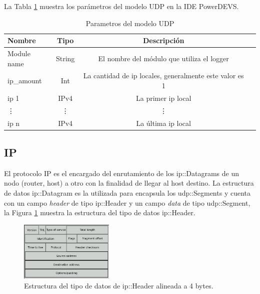 \documentclass[10pt,a4paper]{article}
\begin{document}
La Tabla \ref{table: parameters UDP} muestra los parámetros del modelo UDP en la IDE PowerDEVS.
\begin{table}[h]
\begin{tabular}{|l|c|c|c|}
  \hline
  Nombre & Tipo & Descripción \\
  \hline
  Module name & String & El nombre del módulo que utiliza el logger \\
  \hline
  ip\_amount & Int & La cantidad de ip locales, generalmente este valor es 1 \\
  \hline
  ip 1 & IPv4 & La primer ip local \\
  \hline
  \vdots & \vdots & \vdots \\
  \hline
  ip n & IPv4 & La última ip local \\
  \hline
\end{tabular}
\caption{Parametros del modelo UDP}
\label{table: parameters UDP}
\end{table}

\subsection{IP}

El protocolo IP es el encargado del enrutamiento de los ip::Datagrams de un nodo (router, host) a otro con la finalidad de llegar al host destino. La estructura de datos ip::Datagram es la utilizada para encapsula los udp::Segments y cuenta con un campo \textit{header} de tipo ip::Header y un campo \textit{data} de tipo udp::Segment, la Figura \ref{figure: ip header} muestra la estructura del tipo de datos ip::Header.  \\

\begin{figure}[!htb]
    \centering
    \includegraphics[width = 0.4\textwidth]{img/png/IP-datagram.png}
    \caption{Estructura del tipo de datos de ip::Header alineada a 4 bytes.}
    \label{figure: ip header}
\end{figure}
\end{document}
